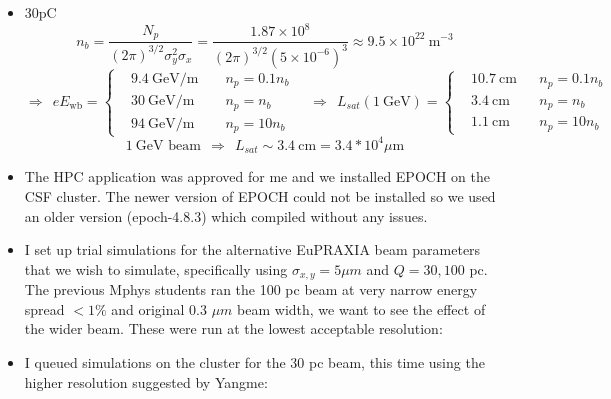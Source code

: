 \documentclass[%
onecolumn, notitlepage,
 amsmath,amssymb,
 aps,
]{article}
\begin{document}
\begin{itemize}
$$\begin{aligned}
&172 ~\text{GeV/m} &&n_p=10 n_b
\end{aligned}\right.\quad\Rightarrow ~~L_{sat}(1 ~\text{GeV})=\left\{\begin{aligned}
&5.8 ~\text{cm}&& n_p=0.1 n_b \\
&1.9 ~\text{cm} && n_p=n_b\\
&0.6 ~\text{cm} &&n_p=10 n_b
\end{aligned}\right.$$
$$1 ~\text{GeV beam} ~~\Rightarrow ~~ L_{sat}\sim 2 ~\text{cm}=2*10^4 \mu \text{m} $$
\item  30pC $$n_b=\frac{N_p}{(2\pi)^{3/2} \sigma_y^2\sigma_x}=\frac{1.87\times 10^{8}}{(2\pi)^{3/2} (5\times 10^{-6})^3}\approx 9.5\times 10^{22}~ \text{m}^{-3} $$
$$\Rightarrow ~~eE_{\text{wb}}=\left\{\begin{aligned}
&9.4 ~\text{GeV/m }&& n_p=0.1 n_b \\
&30 ~\text{GeV/m} && n_p=n_b\\
&94 ~\text{GeV/m} &&n_p=10 n_b
\end{aligned}\right.\quad\Rightarrow ~~L_{sat}(1 ~\text{GeV})=\left\{\begin{aligned}
&10.7 ~\text{cm}&& n_p=0.1 n_b \\
&3.4 ~\text{cm} && n_p=n_b\\
&1.1 ~\text{cm} &&n_p=10 n_b
\end{aligned}\right.$$
$$1 ~\text{GeV beam} ~~\Rightarrow ~~ L_{sat}\sim 3.4 ~\text{cm}=3.4*10^4 \mu \text{m} $$


\end{itemize}

\begin{itemize}
\item[\textcolor{MancPurple}{\textbullet}] The HPC application was approved for me and we installed EPOCH on the CSF cluster. The newer version of EPOCH could not be installed so we used an older version (epoch-4.8.3) which compiled without any issues. 
\item[\textcolor{MancPurple}{\textbullet}] I set up trial simulations for the alternative EuPRAXIA beam parameters that we wish to simulate, specifically using $\sigma_{x,y}=5 \mu m$ and $Q=30, 100$ pc. The previous Mphys students ran the 100 pc beam at very narrow energy spread $< 1\%$ and original 0.3 $\mu m$ beam width, we want to see the effect of the wider beam. These were run at the lowest acceptable resolution:
\item[\textcolor{MancPurple}{\textbullet}] I queued simulations on the cluster for the 30 pc beam, this time using the higher resolution suggested by Yangme:
\end{itemize}
\end{document}
